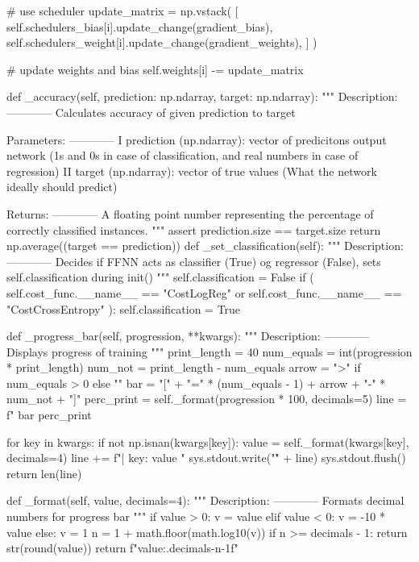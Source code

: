 \documentclass[%
oneside,                 %
final,                   %
10pt]{article}
\begin{document}
            # use scheduler
            update_matrix = np.vstack(
                [
                    self.schedulers_bias[i].update_change(gradient_bias),
                    self.schedulers_weight[i].update_change(gradient_weights),
                ]
            )

            # update weights and bias
            self.weights[i] -= update_matrix

    def _accuracy(self, prediction: np.ndarray, target: np.ndarray):
        """
        Description:
        ------------
            Calculates accuracy of given prediction to target

        Parameters:
        ------------
            I   prediction (np.ndarray): vector of predicitons output network
                (1s and 0s in case of classification, and real numbers in case of regression)
            II  target (np.ndarray): vector of true values (What the network ideally should predict)

        Returns:
        ------------
            A floating point number representing the percentage of correctly classified instances.
        """
        assert prediction.size == target.size
        return np.average((target == prediction))
    def _set_classification(self):
        """
        Description:
        ------------
            Decides if FFNN acts as classifier (True) og regressor (False),
            sets self.classification during init()
        """
        self.classification = False
        if (
            self.cost_func.__name__ == "CostLogReg"
            or self.cost_func.__name__ == "CostCrossEntropy"
        ):
            self.classification = True

    def _progress_bar(self, progression, **kwargs):
        """
        Description:
        ------------
            Displays progress of training
        """
        print_length = 40
        num_equals = int(progression * print_length)
        num_not = print_length - num_equals
        arrow = ">" if num_equals > 0 else ""
        bar = "[" + "=" * (num_equals - 1) + arrow + "-" * num_not + "]"
        perc_print = self._format(progression * 100, decimals=5)
        line = f"  {bar} {perc_print}%

        for key in kwargs:
            if not np.isnan(kwargs[key]):
                value = self._format(kwargs[key], decimals=4)
                line += f"| {key}: {value} "
        sys.stdout.write("\r" + line)
        sys.stdout.flush()
        return len(line)

    def _format(self, value, decimals=4):
        """
        Description:
        ------------
            Formats decimal numbers for progress bar
        """
        if value > 0:
            v = value
        elif value < 0:
            v = -10 * value
        else:
            v = 1
        n = 1 + math.floor(math.log10(v))
        if n >= decimals - 1:
            return str(round(value))
        return f"{value:.{decimals-n-1}f}"
\end{document}
